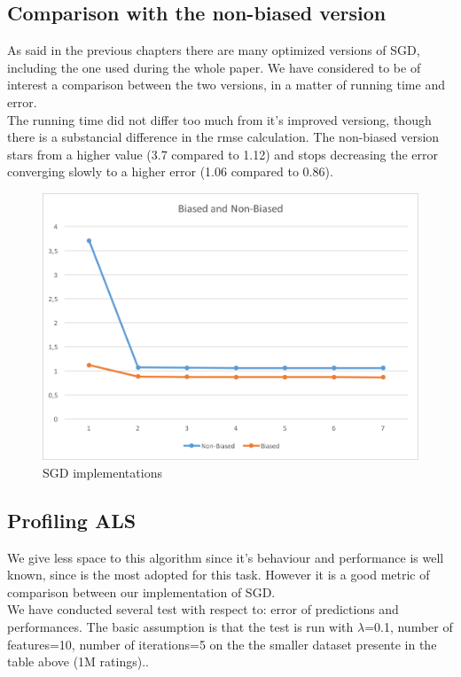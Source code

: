 \documentclass{sig-alternate-05-2015}
\begin{document}
\subsection{Comparison with the non-biased version}
As said in the previous chapters there are many optimized versions of SGD,
including the one used during the whole paper. We have considered to be of
interest a comparison between the two versions, in a matter of running time
and error.\\
The running time did not differ too much from it's improved versiong, though there
is a substancial difference in the rmse calculation. The non-biased version
stars from a higher value (3.7 compared to 1.12) and stops decreasing
the error converging slowly to a higher error (1.06 compared to 0.86).

\begin{figure}
    \caption{SGD implementations}
    \centering
    \includegraphics[scale=0.55]{biasvsunbias.png}
\end{figure}



\subsection{Profiling ALS}

We give less space to this algorithm since it's behaviour and performance
is well known, since is the most adopted for this task. However it is
a good metric of comparison between our implementation of SGD.\\
We have conducted several test with respect to: error of predictions and performances. The basic assumption is that the test is run with $\lambda$=0.1, number of features=10, number of iterations=5 on the the smaller dataset presente in the table above (1M ratings)..
\end{document}
